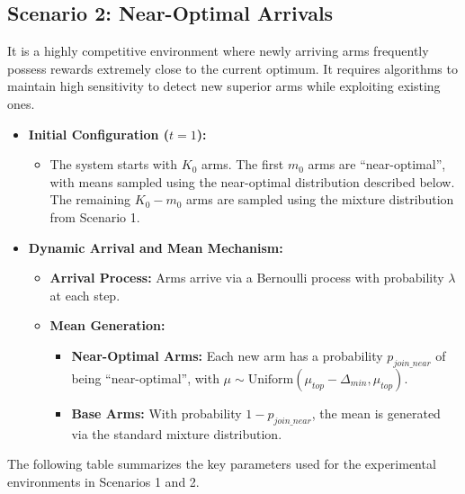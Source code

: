 \documentclass[
  12pt]{article}
\begin{document}
\subsection{Scenario 2: Near-Optimal Arrivals}
 It is a highly competitive environment where newly arriving arms frequently possess rewards extremely close to the current optimum. It requires algorithms to maintain high sensitivity to detect new superior arms while exploiting existing ones.

\begin{itemize}
    \item \textbf{Initial Configuration ($t=1$):} 
    \begin{itemize}
        \item The system starts with $K_0$ arms. The first $m_0$ arms are ``near-optimal'', with means sampled using the near-optimal distribution described below. The remaining $K_0 - m_0$ arms are sampled using the mixture distribution from Scenario 1.
    \end{itemize}
    \item \textbf{Dynamic Arrival and Mean Mechanism:} 
    \begin{itemize}
        \item \textbf{Arrival Process:} Arms arrive via a Bernoulli process with probability $\lambda$ at each step.
        \item \textbf{Mean Generation:} 
        \begin{itemize}
            \item \textbf{Near-Optimal Arms:} Each new arm has a probability $p_{join\_near}$ of being ``near-optimal'', with $\mu \sim \text{Uniform}(\mu_{top} - \Delta_{min}, \mu_{top})$.
            \item \textbf{Base Arms:} With probability $1 - p_{join\_near}$, the mean is generated via the standard mixture distribution.

        \end{itemize}
    \end{itemize}
\end{itemize}


The following table summarizes the key parameters used for the experimental environments in Scenarios 1 and 2.
\end{document}
